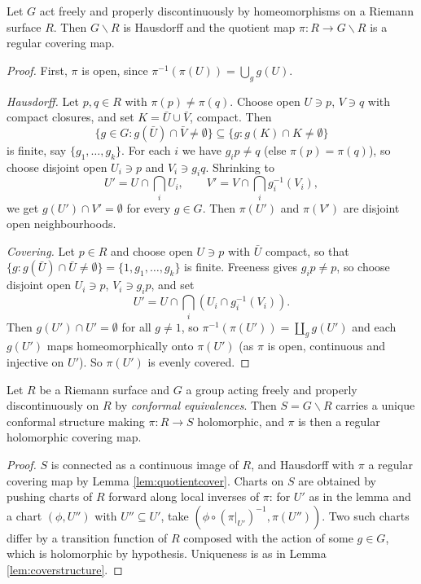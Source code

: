 \begin{lemma}\label{lem:quotientcover}
	Let $G$ act freely and properly discontinuously by homeomorphisms on a Riemann surface
	$R$. Then $G\backslash R$ is Hausdorff and the quotient map $\pi : R \to G\backslash R$
	is a regular covering map.
\end{lemma}

\begin{proof}
	First, $\pi$ is open, since $\pi^{-1}(\pi(U)) = \bigcup_{g} g(U)$.

	\emph{Hausdorff.} Let $p, q \in R$ with $\pi(p)\neq\pi(q)$. Choose open $U\ni p$,
	$V\ni q$ with compact closures, and set $K = \bar U\cup\bar V$, compact. Then
	$$
	\{g \in G : g(\bar U)\cap \bar V \neq \emptyset\} \subseteq \{g : g(K)\cap K \neq\emptyset\}
	$$
	is finite, say $\{g_1,\dots,g_k\}$. For each $i$ we have $g_i p \neq q$ (else
	$\pi(p)=\pi(q)$), so choose disjoint open $U_i \ni p$ and $V_i \ni g_i q$. Shrinking to
	$$
	U' = U \cap \bigcap_i U_i, \qquad V' = V\cap\bigcap_i g_i^{-1}(V_i),
	$$
	we get $g(U')\cap V' = \emptyset$ for every $g \in G$. Then $\pi(U')$ and $\pi(V')$ are
	disjoint open neighbourhoods.

	\emph{Covering.} Let $p \in R$ and choose open $U\ni p$ with $\bar U$ compact, so that
	$\{g : g(\bar U)\cap\bar U\neq\emptyset\} = \{1, g_1,\dots,g_k\}$ is finite. Freeness
	gives $g_ip\neq p$, so choose disjoint open $U_i\ni p$, $V_i \ni g_ip$, and set
	$$
	U' = U\cap\bigcap_i\left(U_i \cap g_i^{-1}(V_i)\right).
	$$
	Then $g(U')\cap U' = \emptyset$ for all $g \neq 1$, so $\pi^{-1}(\pi(U')) =
	\coprod_g g(U')$ and each $g(U')$ maps homeomorphically onto $\pi(U')$ (as $\pi$ is
	open, continuous and injective on $U'$). So $\pi(U')$ is evenly covered.
\end{proof}

\begin{proposition}\label{prop:quotientRS}
	Let $R$ be a Riemann surface and $G$ a group acting freely and properly discontinuously
	on $R$ by \emph{conformal equivalences}. Then $S = G\backslash R$ carries a unique
	conformal structure making $\pi : R \to S$ holomorphic, and $\pi$ is then a regular
	holomorphic covering map.
\end{proposition}

\begin{proof}
	$S$ is connected as a continuous image of $R$, and Hausdorff with $\pi$ a regular
	covering map by Lemma \ref{lem:quotientcover}. Charts on $S$ are obtained by pushing
	charts of $R$ forward along local inverses of $\pi$: for $U'$ as in the lemma and a
	chart $(\phi, U'')$ with $U''\subseteq U'$, take $(\phi\circ(\pi|_{U'})^{-1}, \pi(U''))$.
	Two such charts differ by a transition function of $R$ composed with the action of some
	$g\in G$, which is holomorphic by hypothesis. Uniqueness is as in Lemma
	\ref{lem:coverstructure}.
\end{proof}


